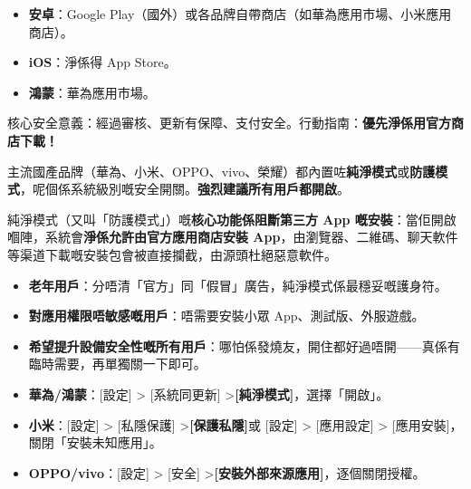 


\begin{itemize}
  \item \textbf{安卓}：Google Play（國外）或各品牌自帶商店（如華為應用市場、小米應用商店）。
  \item \textbf{iOS}：淨係得 App Store。
  \item \textbf{鴻蒙}：華為應用市場。
\end{itemize}

核心安全意義：經過審核、更新有保障、支付安全。行動指南：\textbf{優先淨係用官方商店下載！}


主流國產品牌（華為、小米、OPPO、vivo、榮耀）都內置咗\textbf{純淨模式}或\textbf{防護模式}，呢個係系統級別嘅安全開關。\textbf{強烈建議所有用戶都開啟}。


純淨模式（又叫「防護模式」）嘅\textbf{核心功能係阻斷第三方 App 嘅安裝}：當佢開啟嗰陣，系統會\textbf{淨係允許由官方應用商店安裝 App}，由瀏覽器、二維碼、聊天軟件等渠道下載嘅安裝包會被直接攔截，由源頭杜絕惡意軟件。


\begin{itemize}
  \item \textbf{老年用戶}：分唔清「官方」同「假冒」廣告，純淨模式係最穩妥嘅護身符。
  \item \textbf{對應用權限唔敏感嘅用戶}：唔需要安裝小眾 App、測試版、外服遊戲。
  \item \textbf{希望提升設備安全性嘅所有用戶}：哪怕係發燒友，開住都好過唔開——真係有臨時需要，再單獨關一下即可。
\end{itemize}


\begin{itemize}
  \item \textbf{華為/鴻蒙}：[設定] > [系統同更新] >\textbf{[純淨模式]}，選擇「開啟」。
  \item \textbf{小米}：[設定] > [私隱保護] >\textbf{[保護私隱]}或 [設定] > [應用設定] > [應用安裝]，關閉「安裝未知應用」。
  \item \textbf{OPPO/vivo}：[設定] > [安全] >\textbf{[安裝外部來源應用]}，逐個關閉授權。
\end{itemize}

